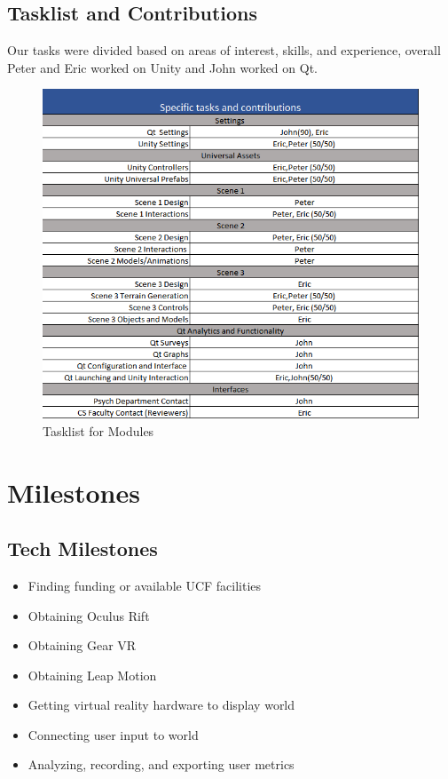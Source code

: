 \documentclass[a4paper,10pt]{article}
\begin{document}
	\subsection{Tasklist and Contributions}
	Our tasks were divided based on areas of interest, skills, and experience, overall Peter and Eric worked on Unity and John worked on Qt.  
	\begin{figure}[H]
	  \includegraphics[width=\linewidth]{tasklist.png}
	  \caption{Tasklist for Modules}
	\label{fig:task}
	\end{figure}
	\pagebreak
	\section{Milestones}
	\subsection{Tech Milestones}
		\begin{itemize}
			\item Finding funding or available UCF facilities
			\item Obtaining Oculus Rift
			\item Obtaining Gear VR
			\item Obtaining Leap Motion
			\item Getting virtual reality hardware to display world
			\item Connecting user input to world
			\item Analyzing, recording, and exporting user metrics
		\end{itemize}
\end{document}
